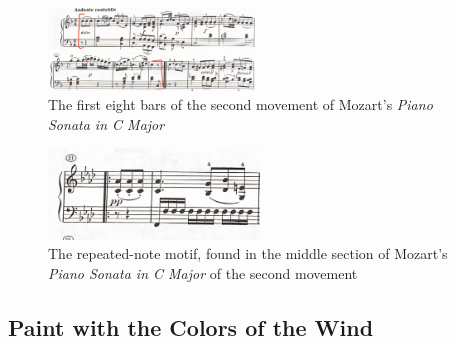 \begin{figure}
    \centering
    \includegraphics[width=0.5\textwidth]{figures/mozart-second-movement-first-eight-bars.jpg}
    \caption{The first eight bars of the second movement of Mozart's \textit{Piano Sonata in C Major}}
    \label{fig:mozart-second-movement-first-eight-bars}
\end{figure}

\begin{figure}
    \centering
    \includegraphics[width=0.5\textwidth]{figures/mozart-second-movement-repeated-note-motif-middle-section.jpg}
    \caption{The repeated-note motif, found in the middle section of Mozart's \textit{Piano Sonata in C Major} of the second movement}
    \label{fig:mozart-second-movement-middle-section-motif}
\end{figure}

\subsection{Paint with the Colors of the Wind}

